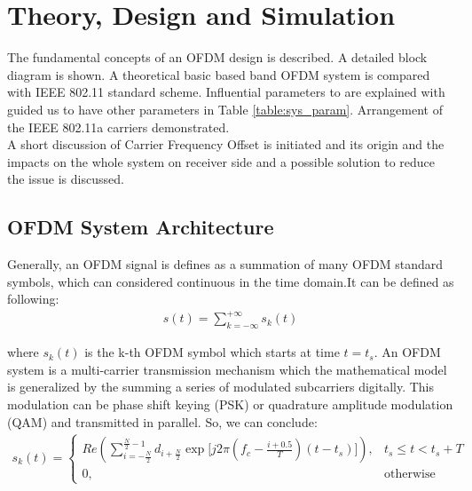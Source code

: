 \chapter{Theory, Design and Simulation}
\label{sec:chapter_2}

The fundamental concepts of an OFDM design is described. A detailed block diagram is shown. A theoretical basic based band OFDM system is compared with IEEE 802.11 standard scheme. Influential parameters to are explained with guided us to have other parameters in Table \ref{table:sys_param}. Arrangement of the IEEE 802.11a carriers demonstrated.\\
A short discussion of Carrier Frequency Offset is initiated and its origin and the impacts on the whole system on receiver side and a possible solution to reduce the issue is discussed.\\

\section{OFDM System Architecture}
Generally, an OFDM signal is defines as a summation of many OFDM standard symbols, which can considered continuous in the time domain.It can be defined as following:\\

\begin{equation} \label{general_form}
\begin{split}
s(t) =\sum\limits_{k=-\infty}^{+\infty} s_{k}(t)
\end{split}
\end{equation}

where $s_{k}(t)$ is the k-th OFDM symbol which starts at time $t= t_{s}$. An OFDM system is a multi-carrier transmission mechanism which the mathematical model is generalized by the summing a series of modulated subcarriers digitally. This modulation can be phase shift keying (PSK) or quadrature amplitude modulation (QAM) and transmitted in parallel. So, we can  conclude:\\
\begin{equation} \label{ofdm_digital_mod}
\begin{split}
s_{k}(t)=
\left\{
	\begin{array}{ll}
	Re\left( \sum\limits_{i=-\frac{N}{2}}^{\frac{N}{2}-1} d_{i+\frac{N}{2}} \exp\lbrack j2\pi(f_{c} - \frac{i+0.5}{T})(t- t_{s})\rbrack\right) , & t_{s}\le t < t_{s} + T\\
	0, & \mbox{otherwise}
	\end{array}
\right.
\end{split}
\end{equation}

